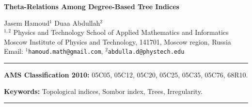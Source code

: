 \documentclass[12pt, a4paper]{article}
\begin{document}
\begin{center}
{\large \bf  Theta-Relations Among Degree-Based Tree Indices}
\end{center}
\begin{center}
 Jasem Hamoud$^1$ \hspace{0.2 cm}  Duaa Abdullah$^{2}$\\[6pt]
 $^{1,2}$ Physics and Technology School of Applied Mathematics and Informatics \\
Moscow Institute of Physics and Technology, 141701, Moscow region, Russia\\[6pt]
Email: 	 $^{1}${\tt hamoud.math@gmail.com},
 $^{2}${\tt abdulla.d@phystech.edu}
\end{center}
\noindent
\begin{abstract}
In this paper, degree-based topological indices play a key role in the structural analysis of graphs in this paper and have significant uses in chemical graph theory. We investigate the connections between three such tree indices: the Albertson, Sombor, and Sigma indices.
We show that the quadratic degree deviation, measured by the Sigma index, tightly controls the Sombor index of a tree by establishing sharp two-sided bounds. We demonstrate that the Sombor and Sigma indices are asymptotically equivalent up to constant factors as a direct result. A pure $\Theta$-relationship between the Sombor index and the Albertson index is derived by taking into account extremal trees with a fixed degree sequence.  This finding demonstrates that, in extremal configurations, quadratic degree interactions and absolute degree disparities scale appropriately. Overall, our data suggest that the Sombor index functions as an intermediate descriptor, capturing both global degree dispersion and local edge irregularity. 
From a structural standpoint, these findings clarify the relationship between vertex-based and edge-based irregularity measurements in trees.
\end{abstract}

\noindent\rule{16cm}{1.0pt}

\noindent\textbf{AMS Classification 2010:} 05C05, 05C12, 05C20, 05C25, 05C35, 05C76, 68R10.


\noindent\textbf{Keywords:} Topological indices, Sombor index, Trees, Irregularity.

\noindent\rule{16cm}{1.0pt}
\end{document}
